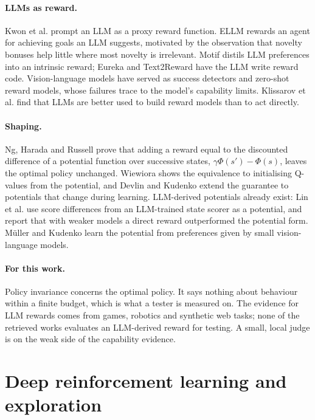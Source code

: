 \paragraph{LLMs as reward.} Kwon et al. prompt an LLM as a proxy
reward function. ELLM rewards an agent for achieving goals an LLM suggests,
motivated by the observation that novelty bonuses help little where most novelty is
irrelevant. Motif distils LLM preferences into an intrinsic
reward; Eureka and Text2Reward have the LLM
write reward code. Vision-language models have served as success
detectors and zero-shot reward models, whose
failures trace to the model's capability limits. Klissarov et al.
find that LLMs are better used to build reward models than to act directly.

\paragraph{Shaping.} Ng, Harada and Russell prove that adding a reward
equal to the discounted difference of a potential function over successive states,
$\gamma\Phi(s') - \Phi(s)$, leaves the optimal policy unchanged.
Wiewiora shows the equivalence to initialising Q-values from the
potential, and Devlin and Kudenko extend the guarantee to
potentials that change during learning. LLM-derived potentials already exist: Lin
et al. use score differences from an LLM-trained state scorer as a
potential, and report that with weaker models a direct reward outperformed the potential
form. M\"uller and Kudenko learn the potential from preferences given
by small vision-language models.

\paragraph{For this work.} Policy invariance concerns the optimal policy. It says nothing
about behaviour within a finite budget, which is what a tester is measured on. The evidence
for LLM rewards comes from games, robotics and synthetic web tasks; none of the retrieved
works evaluates an LLM-derived reward for testing. A small, local judge is on the weak side
of the capability evidence.

\section{Deep reinforcement learning and exploration}
\label{sec:bg-drl}

